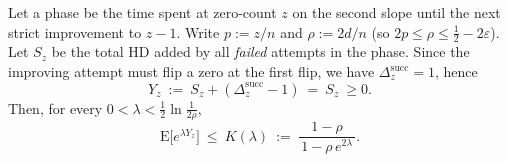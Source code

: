 \documentclass[lettersize,journal]{IEEEtran}
\newcommand{\EE}{\text{E}}
\begin{document}
%

\begin{lemma}\label{lem:phase-mgf}
	Let a phase be the time spent at zero-count $z$ on the second slope until the next strict improvement to $z-1$.
	Write $p:=z/n$ and $\rho:=2d/n$ (so $2p\le \rho \le \tfrac12-2\varepsilon$).
	Let $S_z$ be the total HD added by all \emph{failed} attempts in the phase.
	Since the improving attempt must flip a zero at the first flip, we have $\Delta^{\mathrm{succ}}_z=1$, hence
	\[
	Y_z\ :=\ S_z+(\Delta^{\mathrm{succ}}_z-1)\ =\ S_z\ \ge 0.
	\]
	Then, for every $0<\lambda<\tfrac12\ln\frac{1}{2\rho}$,
	\[
	\EE\!\big[e^{\lambda Y_z}\big]\ \le\ K(\lambda)\ :=\ \frac{1-\rho}{\,1-\rho\,e^{2\lambda}\,}.
	\]
\end{lemma}
\end{document}
